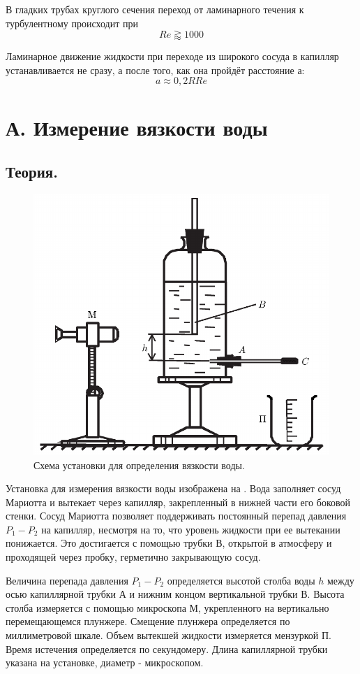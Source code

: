 \documentclass[a4paper,12pt]{article}
\numberwithin{equation}{section}
\begin{document}
В гладких трубах круглого сечения переход от ламинарного течения к турбулентному происходит при \[Re \gtrapprox 1000\]

Ламинарное движение жидкости при переходе из широкого сосуда в капилляр устанавливается не сразу, а после того, как она пройдёт
расстояние а:
\[a \approx 0,2 R Re\]

\section{А. Измерение вязкости воды}
\subsection{Теория.}

\begin{figure}[H]
  \centering
  \includegraphics[scale=0.7]{data/a.png}
  \caption{Схема установки для определения вязкости воды.}
  \label{fig:vac}
\end{figure}

Установка для измерения вязкости воды изображена на .
Вода заполняет сосуд Мариотта и вытекает через капилляр, закрепленный в нижней части его боковой стенки. Сосуд Мариотта позволяет поддерживать постоянный перепад давления $P_1 - P_2$ на капилляр, несмотря на то, что уровень жидкости при ее вытекании понижается. Это достигается с помощью трубки В, открытой в атмосферу и проходящей через пробку, герметично закрывающую сосуд. \par
Величина перепада давления $P_1 - P_2$ определяется высотой столба воды $h$ между осью капиллярной трубки А и нижним концом вертикальной трубки В. Высота столба измеряется с помощью микроскопа М, укрепленного на вертикально перемещающемся плунжере. Смещение плунжера определяется по миллиметровой шкале. Объем вытекшей жидкости измеряется мензуркой П. Время истечения определяется по секундомеру. Длина капиллярной трубки указана на установке, диаметр - микроскопом.
\end{document}
